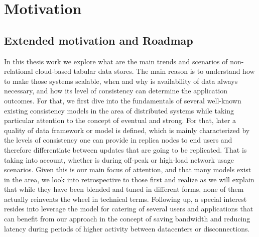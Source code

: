 
%
%


\chapter{Motivation}
\label{ch:motivation}




\section{Extended motivation and Roadmap}
In this thesis work we explore what are the main trends and scenarios of non-relational cloud-based tabular data stores. The main reason is to understand how to make those systems scalable, when and why is availability of data always necessary, and how its level of consistency can determine the application outcomes. For that, we first dive into the fundamentals of several well-known existing consistency models in the area of distributed systems while taking particular attention to the concept of eventual and strong. For that, later a quality of data framework or model is defined, which is mainly characterized by the levels of consistency one can provide in replica nodes to end users and therefore differentiate between updates that are going to be replicated. That is taking into account, whether is during off-peak or high-load network usage scenarios. Given this is our main focus of attention, and that many models exist in the area, we look into retrospective to those first and realize as we will explain that while they have been blended and tuned in different forms, none of them actually reinvents the wheel in technical terms. Following up, a special interest resides into leverage the model for catering of several users and applications that can benefit from our approach in the concept of saving bandwidth and reducing latency during periods of higher activity between datacenters or disconnections.

